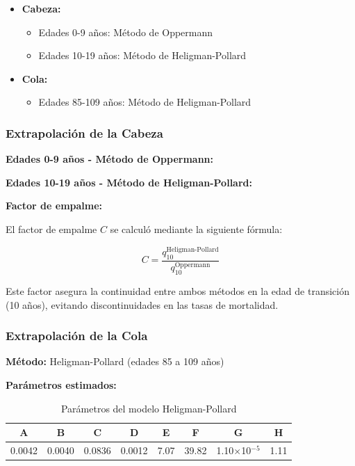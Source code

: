 \begin{itemize}
    \item \textbf{Cabeza:}
    \begin{itemize}
        \item Edades 0-9 años: Método de Oppermann
        \item Edades 10-19 años: Método de Heligman-Pollard
    \end{itemize}
    \item \textbf{Cola:}
    \begin{itemize}
        \item Edades 85-109 años: Método de Heligman-Pollard
    \end{itemize}
\end{itemize}

\subsubsection{Extrapolación de la Cabeza}

\textbf{Edades 0-9 años - Método de Oppermann:}

\textbf{Edades 10-19 años - Método de Heligman-Pollard:}

\textbf{Factor de empalme:}

El factor de empalme $C$ se calculó mediante la siguiente fórmula:

\begin{equation}
C = \frac{q_{10}^{\text{Heligman-Pollard}}}{q_{10}^{\text{Oppermann}}}
\end{equation}

Este factor asegura la continuidad entre ambos métodos en la edad de transición (10 años), evitando discontinuidades en las tasas de mortalidad.

\subsubsection{Extrapolación de la Cola}

\textbf{Método:} Heligman-Pollard (edades 85 a 109 años)

\textbf{Parámetros estimados:}

\begin{table}[H]
\centering
\caption{Parámetros del modelo Heligman-Pollard}
\label{tab:parametros_hp}
\small
\begin{tabular}{cccccccc}
\toprule
\tableheadercolor
\textbf{A} & \textbf{B} & \textbf{C} & \textbf{D} & \textbf{E} & \textbf{F} & \textbf{G} & \textbf{H} \\
\midrule
0.0042 & 0.0040 & 0.0836 & 0.0012 & 7.07 & 39.82 & 1.10$\times$10$^{-5}$ & 1.11 \\
\bottomrule
\end{tabular}
\end{table}

